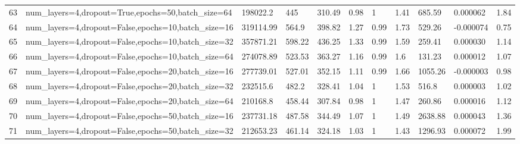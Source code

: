 \begin{longtable}{C{0.8cm} L{2cm} C{1.15cm} C{1.15cm} C{1.15cm} C{1.15cm} C{0.85cm} C{1.25cm} C{1.2cm} C{1.5cm} C{1.0cm}}
63 & num\_layers=4,\newline dropout=True,\newline epochs=50,\newline batch\_size=64 & 198022.2 & 445 & 310.49 & 0.98 & 1 & 1.41 & 685.59 & 0.000062 & 1.84 \\
64 & num\_layers=4,\newline dropout=False,\newline epochs=10,\newline batch\_size=16 & 319114.99 & 564.9 & 398.82 & 1.27 & 0.99 & 1.73 & 529.26 & -0.000074 & 0.75 \\
65 & num\_layers=4,\newline dropout=False,\newline epochs=10,\newline batch\_size=32 & 357871.21 & 598.22 & 436.25 & 1.33 & 0.99 & 1.59 & 259.41 & 0.000030 & 1.14 \\
66 & num\_layers=4,\newline dropout=False,\newline epochs=10,\newline batch\_size=64 & 274078.89 & 523.53 & 363.27 & 1.16 & 0.99 & 1.6 & 131.23 & 0.000012 & 1.07 \\
67 & num\_layers=4,\newline dropout=False,\newline epochs=20,\newline batch\_size=16 & 277739.01 & 527.01 & 352.15 & 1.11 & 0.99 & 1.66 & 1055.26 & -0.000003 & 0.98 \\
68 & num\_layers=4,\newline dropout=False,\newline epochs=20,\newline batch\_size=32 & 232515.6 & 482.2 & 328.41 & 1.04 & 1 & 1.53 & 516.8 & 0.000003 & 1.02 \\
69 & num\_layers=4,\newline dropout=False,\newline epochs=20,\newline batch\_size=64 & 210168.8 & 458.44 & 307.84 & 0.98 & 1 & 1.47 & 260.86 & 0.000016 & 1.12 \\
70 & num\_layers=4,\newline dropout=False,\newline epochs=50,\newline batch\_size=16 & 237731.18 & 487.58 & 344.49 & 1.07 & 1 & 1.49 & 2638.88 & 0.000043 & 1.36 \\
71 & num\_layers=4,\newline dropout=False,\newline epochs=50,\newline batch\_size=32 & 212653.23 & 461.14 & 324.18 & 1.03 & 1 & 1.43 & 1296.93 & 0.000072 & 1.99 \\

\end{longtable}
